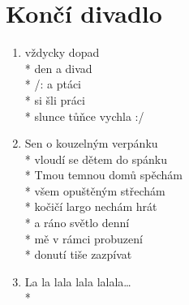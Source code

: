 \section{Končí divadlo}
\begin{enumerate}
\item {} vždycky  dopad \\*
 den a  divad \\*
/:  a  ptáci \\*
 si šli  práci \\*
slunce tůňce vychla :/ 
\item Sen o kouzelným verpánku \\*
vloudí se dětem do spánku \\*
Tmou temnou domů spěchám \\*
všem opuštěným střechám \\*
kočičí largo nechám hrát \\*
a ráno světlo denní \\*
mě v rámci probuzení \\*
donutí tiše zazpívat 
\item La la lala lala lalala… \\*
\end{enumerate}
